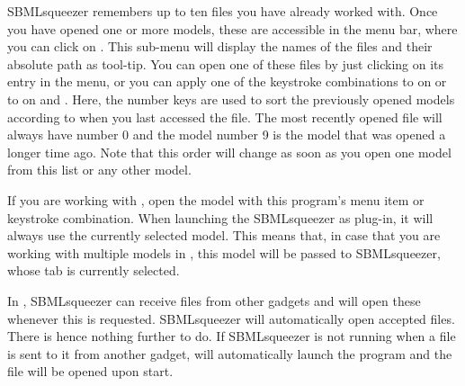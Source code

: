 SBMLsqueezer remembers up to ten files you have already worked with.
Once you have opened one or more models, these are accessible in the menu bar,
where you can click on .
This sub-menu will display the names of the files and their absolute path as tool-tip.
You can open one of these files by just clicking on its entry in the menu, or
you can apply one of the keystroke combinations  to 
on \MacOSX or  to  on \Linux and \Windows.
Here, the number keys are used to sort the previously opened models according to
when you last accessed the file.
The most recently opened file will always have number 0 and the model number 9
is the model that was opened a longer time ago.
Note that this order will change as soon as you open one model from this list
or any other model.

If you are working with \CellDesigner, open the model with this program's menu item or keystroke combination.
When launching the SBMLsqueezer as \CellDesigner plug-in, it will always use the currently selected model.
This means that, in case that you are working with multiple models in \CellDesigner, this model will be passed to SBMLsqueezer, whose tab is currently selected.

In \Garuda, SBMLsqueezer can receive files from other gadgets and will open these whenever this is requested.
SBMLsqueezer will automatically open accepted files.
There is hence nothing further to do.
If SBMLsqueezer is not running when a file is sent to it from another gadget, \Garuda will automatically launch the program and the file will be opened upon start.

